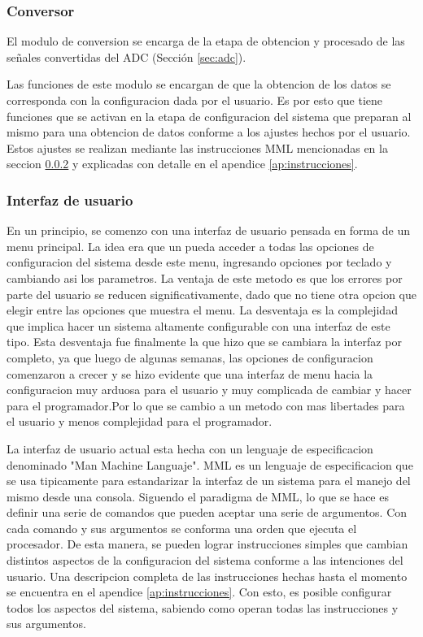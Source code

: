 \subsubsection{Conversor}\label{sec:conversorsw}
El modulo de conversion se encarga de la etapa de obtencion y procesado de las se\~nales convertidas del ADC (Secci\'on \ref{sec:adc}).

Las funciones de este modulo se encargan de que la obtencion de los datos se corresponda con la configuracion dada por el usuario. Es por esto que tiene funciones que se activan en la etapa de configuracion del sistema que preparan al mismo para una obtencion de datos conforme a los ajustes hechos por el usuario. Estos ajustes se realizan mediante las instrucciones MML mencionadas en la seccion \ref{secc:interfaz} y explicadas con detalle en el apendice \ref{ap:instrucciones}.


\subsubsection{Interfaz de usuario}\label{secc:interfaz}
En un principio, se comenzo con una interfaz de usuario pensada en forma de un menu principal. La idea era que un pueda acceder a todas las opciones de configuracion del sistema desde este menu, ingresando opciones por teclado y cambiando asi los parametros. La ventaja de este metodo es que los errores por parte del usuario se reducen significativamente, dado que no tiene otra opcion que elegir entre las opciones que muestra el menu. La desventaja es la complejidad que implica hacer un sistema altamente configurable con una interfaz de este tipo. Esta desventaja fue finalmente la que hizo que se cambiara la interfaz por completo, ya que luego de algunas semanas, las opciones de configuracion comenzaron a crecer y se hizo evidente que una interfaz de menu hacia la configuracion muy arduosa para el usuario y muy complicada de cambiar y hacer para el programador.Por lo que se cambio a un metodo con mas libertades para el usuario y menos complejidad para el programador.

La interfaz de usuario actual esta hecha con un lenguaje de especificacion denominado "Man Machine Languaje". MML es un lenguaje de especificacion que se usa tipicamente para estandarizar la interfaz de un sistema para el manejo del mismo desde una consola. Siguendo el paradigma de MML, lo que se hace es definir una serie de comandos que pueden aceptar una serie de argumentos. Con cada comando y sus argumentos se conforma una orden que ejecuta el procesador. De esta manera, se pueden lograr instrucciones simples que cambian distintos aspectos de la configuracion del sistema conforme a las intenciones del usuario. Una descripcion completa de las instrucciones hechas hasta el momento se encuentra en el apendice \ref{ap:instrucciones}. Con esto, es posible configurar todos los aspectos del sistema, sabiendo como operan todas las instrucciones y sus argumentos.

